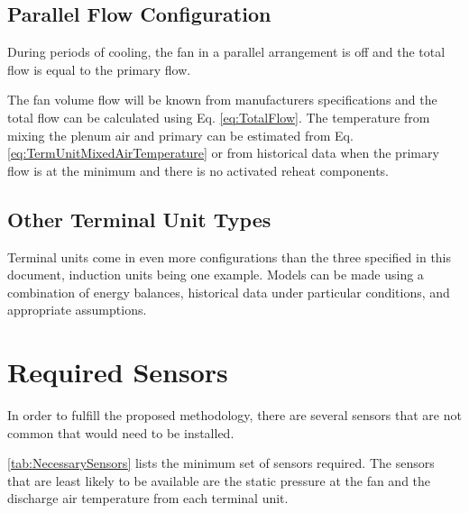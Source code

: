 \subsection{Parallel Flow Configuration}

During periods of cooling, the fan in a parallel arrangement is off and the
total flow is equal to the primary flow.

The fan volume flow will be known from manufacturers specifications and the
total flow can be calculated using Eq. \eqref{eq:TotalFlow}. The temperature
from mixing the plenum air and primary can be estimated from Eq.
\eqref{eq:TermUnitMixedAirTemperature} or from historical data when the primary flow is
at the minimum and there is no activated reheat components.

\subsection{Other Terminal Unit Types}

Terminal units come in even more configurations than the three specified
in this document, induction units being one example. Models can be made
using a combination of energy balances, historical data under particular
conditions, and appropriate assumptions.

\section{Required Sensors}

In order to fulfill the proposed methodology, there are several sensors that
are not common that would need to be installed.

\tableref{} \ref{tab:NecessarySensors} lists the minimum set of sensors
required. The sensors that are least likely to be available are the static
pressure at the fan and the discharge air temperature from each terminal
unit.

